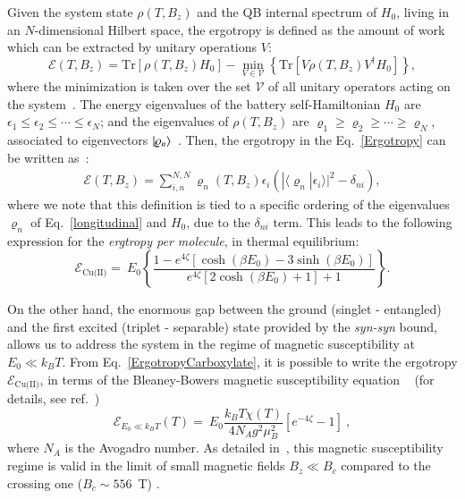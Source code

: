 \documentclass[aps,prl,epsfigure,twocolumn,superscriptaddress]{revtex4-1}
\newcommand{\Ecal}{\mathcal{E}}
\newcommand{\Vcal}{\mathcal{V}}
\newcommand{\1}{\mathbbm{1}}
\newcommand{\interpro}[2]{\langle #1 | #2 \rangle}
\begin{document}
Given the system state $\rho(T,B_z)$ and the QB internal spectrum of $H_{0}$, living in an $N$-dimensional Hilbert space, the ergotropy is defined as the amount of work which can be extracted by unitary operations $V$:
\begin{equation}
	\Ecal(T,B_z)\!=\!\mbox{Tr}\left[\rho(T,B_z) H_{0}\right] - \min_{V\in \Vcal}\left\{\mbox{Tr}\left[V\rho(T,B_z) V^\dagger H_{0}\right]\right\},
	\label{Ergotropy}
\end{equation}
where the minimization is taken over the set $\Vcal$ of all unitary operators acting on the system~\cite{Allahverdyan:04}. The energy eigenvalues of the battery self-Hamiltonian $H_0$ are $\epsilon_{1}\!\leq\!\epsilon_{2}\!\leq\!\cdots\!\leq\!\epsilon_{N}$; and the eigenvalues of $\rho(T,B_z)$ are $\varrho_{1}\!\geq\!\varrho_{2}\!\geq\!\cdots\!\geq\!\varrho_{N}$, associated to eigenvectors $\ket{\varrho_{n}}$~\cite{SupInf}. Then, the ergotropy in the Eq.~\eqref{Ergotropy} can be written as~\cite{Allahverdyan:04}:
\begin{align}
	\Ecal(T,B_z) = \sum\nolimits_{i,n}^{N,N} \varrho_{n}(T,B_z) \epsilon_{i} \left( |\interpro{\varrho_{n}}{\epsilon_{i}}|^2 - \delta_{ni} \right) , \label{ErgotropyXstates}
\end{align}	
where we note that this definition is tied to a specific ordering of the eigenvalues $\varrho_{n}$ of Eq.~\eqref{longitudinal} and $H_0$, due to the $\delta_{ni}$ term. This leads to the following expression for the {\it ergtropy per molecule}, in thermal equilibrium:
\begin{equation}
	\Ecal_{\text{Cu(II)}} = \
	E_{0} \left\{\frac{1 - e^{{4\zeta}}\left[\cosh \left(\beta E_{0}\right)-3 \sinh \left(\beta E_{0}\right)\right]}{e^{{4\zeta}}\left[2 \cosh \left(\beta E_{0}\right)+1\right]+1}\right\}.
	\label{ErgotropyCarboxylate}
\end{equation}

On the other hand, the enormous gap between the ground (singlet - entangled) and the first excited (triplet - separable) state provided by the \textit{syn-syn} bound, allows us to address the system in the regime of magnetic susceptibility at $E_0\ll k_{B}T$. From Eq.~\eqref{ErgotropyCarboxylate}, it is possible to write the ergotropy $\Ecal_{\text{Cu(II)}}$, in terms of the Bleaney-Bowers magnetic susceptibility equation  ~\cite{bleaney1952anomalous} (for details, see ref.~\cite{SupInf})
\begin{equation}
	\Ecal_{E_0\ll k_{B}T}(T)  = \
	E_{0} \frac{k_BT\chi(T)}{4N_Ag^2\mu_B^2}\left[ e^{-4\zeta} -1\right]~, 
	\label{Ergotropysus}
\end{equation}
where $N_A$ is the Avogadro number. As detailed in~\cite{SupInf}, this magnetic susceptibility regime is valid in the limit of small magnetic  fields $B_{z}\ll B_{c}$ compared to the crossing one ($B_c\!\sim\!556$~T) \cite{chakraborty2019magnetocaloric}.
\end{document}
